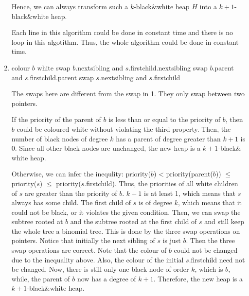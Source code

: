 \documentclass[10pt]{article}
\begin{document}
\begin{enumerate}
		Hence, we can always transform such a $k$-black$\&$white heap $H$ into a
		$k+1$-black$\&$white heap.

		Each line in this algorithm could be done in constant time and there is
		no loop in this algotithm.
		Thus, the whole algorithm could be done in constant time.

	\item
	\begin{comment}
		Suppose you have a linked-list H of binomial trees that satisfies all
		the properties of a black$&$white heap except that it has one black node
		$b$ of degree $k$ and its parent has degree greater than $k+1$.
		Suppose that the sibling $s$ of degree $k+1$ of $b$ is white.
		Given pointers to $b$ and $s$, explain how to transform H in constant
		time into a k'-black$&$white heap with the same set of nodes, for some
		$k' > k$.
	\end{comment}

		\begin{algorithmic}[1]
				\State colour $b$ white
			\Else
				\State swap $b$.nextsibling and $s$.firstchild.nextsibling
				\State swap $b$.parent and $s$.firstchild.parent
				\State swap $s$.nextsibling and $s$.firstchild
			\EndIf
		\end{algorithmic}

		The swaps here are different from the swap in 1.
		They only swap between two pointers.

		If the priority of the parent of $b$ is less than or equal to the
		priority of $b$, then $b$ could be coloured white without violating the
		third property.
		Then, the number of black nodes of degree $k$ has a parent of degree
		greater than $k+1$ is 0.
		Since all other black nodes are unchanged, the new heap is a
		$k+1$-black$\&$white heap.

		Otherwise, we can infer the inequlity: priority($b$) <
		priority(parent($b$)) $\leq$ priority($s$) $\leq$
		priority($s$.firstchild).
		Thus, the priorities of all white children of $s$ are greater than the
		priority of $b$.
		$k+1$ is at least 1, which means that $s$ always has some child.
		The first child of $s$ is of degree $k$, which means that it could not
		be black, or it violates the given condition. 
		Then, we can swap the subtree rooted at $b$ and the subtree rooted at
		the first child of $s$ and still keep the whole tree a binomial tree. 
		This is done by the three swap operations on pointers. 
		Notice that initially the next sibling of $s$ is just $b$.
		Then the three swap operations are correct.
		Note that the colour of $b$ could not be changed due to the inequality
		above.
		Also, the colour of the initial $s$.firstchild need not be changed.
		Now, there is still only one black node of order $k$, which is $b$,
		while, the parent of $b$ now has a degree of $k+1$.
		Therefore, the new heap is a $k+1$-black$\&$white heap.


\end{enumerate}
\end{document}
